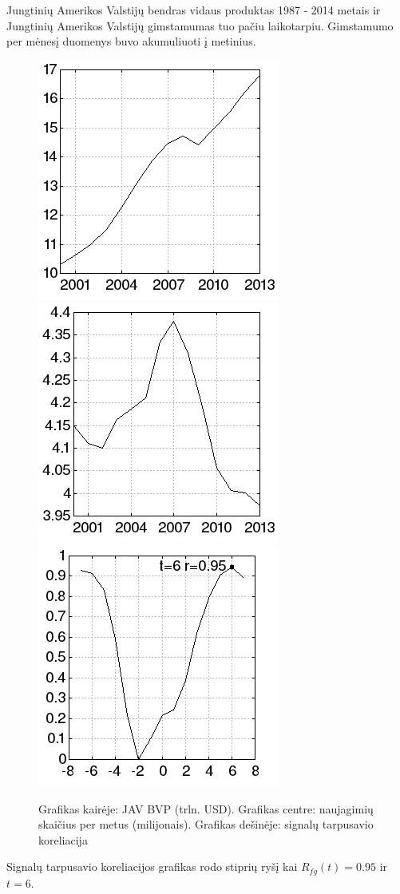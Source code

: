Jungtinių Amerikos Valstijų bendras vidaus produktas\cite{gdp} 1987 - 2014 metais ir
Jungtinių Amerikos Valstijų gimstamumas\cite{births} tuo pačiu laikotarpiu.
Gimstamumo per mėnesį duomenys buvo akumuliuoti į metinius.

\begin{figure}
\includegraphics[scale=0.65]{../scripts/gdp_births/gdp.png}
\includegraphics[scale=0.65]{../scripts/gdp_births/births.png}
\includegraphics[scale=0.65]{../scripts/gdp_births/result.png}
    \caption{Grafikas kairėje: JAV BVP (trln. USD). Grafikas centre: naujagimių skaičius per metus (milijonais). Grafikas dešinėje: signalų tarpusavio koreliacija}
\end{figure}

Signalų tarpusavio koreliacijos grafikas rodo stiprių ryšį kai \( R_{fg}(t) = 0.95 \) ir \( t = 6 \).

